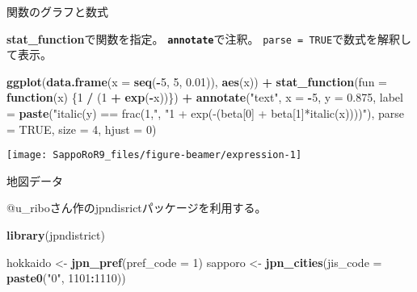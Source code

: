 \documentclass[ignorenonframetext,]{beamer}
\newenvironment{Shaded}{\begin{snugshade}}{\end{snugshade}}
\newcommand{\KeywordTok}[1]{\textcolor[rgb]{0.13,0.29,0.53}{\textbf{#1}}}
\newcommand{\DataTypeTok}[1]{\textcolor[rgb]{0.13,0.29,0.53}{#1}}
\newcommand{\DecValTok}[1]{\textcolor[rgb]{0.00,0.00,0.81}{#1}}
\newcommand{\FloatTok}[1]{\textcolor[rgb]{0.00,0.00,0.81}{#1}}
\newcommand{\StringTok}[1]{\textcolor[rgb]{0.31,0.60,0.02}{#1}}
\newcommand{\OtherTok}[1]{\textcolor[rgb]{0.56,0.35,0.01}{#1}}
\newcommand{\ControlFlowTok}[1]{\textcolor[rgb]{0.13,0.29,0.53}{\textbf{#1}}}
\newcommand{\OperatorTok}[1]{\textcolor[rgb]{0.81,0.36,0.00}{\textbf{#1}}}
\newcommand{\NormalTok}[1]{#1}
\let\oldShaded\Shaded
\let\endoldShaded\endShaded
\renewenvironment{Shaded}{\footnotesize\oldShaded}{\endoldShaded}
\begin{document}
\begin{frame}[fragile]{関数のグラフと数式}

\textbf{stat\_function}で関数を指定。 \textbf{\texttt{annotate}}で注釈。
\texttt{parse\ =\ TRUE}で数式を解釈して表示。

\begin{Shaded}
\begin{Highlighting}[]
\KeywordTok{ggplot}\NormalTok{(}\KeywordTok{data.frame}\NormalTok{(}\DataTypeTok{x =} \KeywordTok{seq}\NormalTok{(}\OperatorTok{-}\DecValTok{5}\NormalTok{, }\DecValTok{5}\NormalTok{, }\FloatTok{0.01}\NormalTok{)), }\KeywordTok{aes}\NormalTok{(x)) }\OperatorTok{+}
\StringTok{  }\KeywordTok{stat_function}\NormalTok{(}\DataTypeTok{fun =} \ControlFlowTok{function}\NormalTok{(x) \{}\DecValTok{1} \OperatorTok{/}\StringTok{ }\NormalTok{(}\DecValTok{1} \OperatorTok{+}\StringTok{ }\KeywordTok{exp}\NormalTok{(}\OperatorTok{-}\NormalTok{x))\}) }\OperatorTok{+}
\StringTok{  }\KeywordTok{annotate}\NormalTok{(}\StringTok{"text"}\NormalTok{, }\DataTypeTok{x =} \OperatorTok{-}\DecValTok{5}\NormalTok{, }\DataTypeTok{y =} \FloatTok{0.875}\NormalTok{,}
      \DataTypeTok{label =} \KeywordTok{paste}\NormalTok{(}\StringTok{"italic(y) == frac(1,"}\NormalTok{, }
                    \StringTok{"1 + exp(-(beta[0] + beta[1]*italic(x))))"}\NormalTok{),}
      \DataTypeTok{parse =} \OtherTok{TRUE}\NormalTok{, }\DataTypeTok{size =} \DecValTok{4}\NormalTok{, }\DataTypeTok{hjust =} \DecValTok{0}\NormalTok{)}
\end{Highlighting}
\end{Shaded}

\texttt{[image: SappoRoR9\_files/figure-beamer/expression-1]}

\end{frame}

\begin{frame}[fragile]{地図データ}

@u\_riboさん作のjpndisrictパッケージを利用する。

\begin{Shaded}
\begin{Highlighting}[]
\KeywordTok{library}\NormalTok{(jpndistrict)}

\NormalTok{hokkaido <-}\StringTok{ }\KeywordTok{jpn_pref}\NormalTok{(}\DataTypeTok{pref_code =} \DecValTok{1}\NormalTok{)}
\NormalTok{sapporo <-}\StringTok{ }\KeywordTok{jpn_cities}\NormalTok{(}\DataTypeTok{jis_code =} \KeywordTok{paste0}\NormalTok{(}\StringTok{"0"}\NormalTok{, }\DecValTok{1101}\OperatorTok{:}\DecValTok{1110}\NormalTok{))}
\end{Highlighting}
\end{Shaded}

\end{frame}
\end{document}
